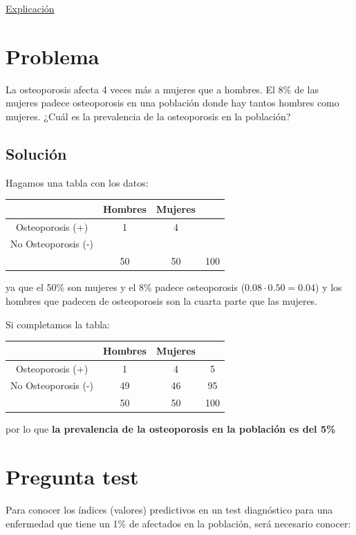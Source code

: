 \documentclass[
]{book}
\begin{document}
\href{https://1fjmanzano.github.io/bioestadistica/relaci\%C3\%B3n-entre-variables-cualitativas.html\#diagno\%CC\%81stico-cli\%CC\%81nico}{Explicación}

\hypertarget{problema-16}{%
\section{Problema}\label{problema-16}}

La osteoporosis afecta 4 veces más a mujeres que a hombres. El 8\% de las mujeres padece osteoporosis en una población donde hay tantos hombres como mujeres. ¿Cuál es la prevalencia de la osteoporosis en la población?

\hypertarget{soluciuxf3n-13}{%
\subsection{Solución}\label{soluciuxf3n-13}}

Hagamos una tabla con los datos:

\begin{longtable}[]{@{}cccc@{}}
\toprule
& Hombres & Mujeres &\tabularnewline
\midrule
\endhead
Osteoporosis (+) & 1 & 4 &\tabularnewline
No Osteoporosis (-) & & &\tabularnewline
& 50 & 50 & 100\tabularnewline
\bottomrule
\end{longtable}

ya que el 50\% son mujeres y el 8\% padece osteoporosis (\(0.08 \cdot 0.50 = 0.04\)) y los hombres que padecen de osteoporosis son la cuarta parte que las mujeres.

Si completamos la tabla:

\begin{longtable}[]{@{}cccc@{}}
\toprule
& Hombres & Mujeres &\tabularnewline
\midrule
\endhead
Osteoporosis (+) & 1 & 4 & 5\tabularnewline
No Osteoporosis (-) & 49 & 46 & 95\tabularnewline
& 50 & 50 & 100\tabularnewline
\bottomrule
\end{longtable}

por lo que \textbf{la prevalencia de la osteoporosis en la población es del 5\%}

\hypertarget{pregunta-test-173}{%
\section{Pregunta test}\label{pregunta-test-173}}

Para conocer los índices (valores) predictivos en un test diagnóstico para una enfermedad que tiene un 1\% de afectados en la población, será necesario conocer:
\end{document}
